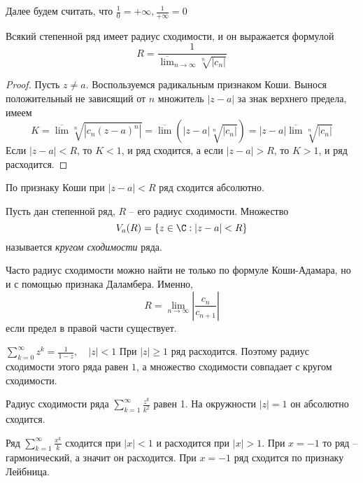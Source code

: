 \begin{Rem}
	Далее будем считать, что $\frac{1}{0} = +\infty, \frac{1}{+\infty} = 0$ 
\end{Rem}

\begin{Thm}
	Всякий степенной ряд имеет радиус сходимости, и он выражается формулой
	\[R = \frac{1}{\displaystyle{\overline{\lim}_{n \to \infty} \sqrt[n]{|c_n|}}}\]
\end{Thm}

\begin{proof}
	Пусть $z \neq a$. Воспользуемся радикальным признаком Коши. Вынося положительный не зависящий от $n$ множитель $|z - a|$ за знак верхнего предела, имеем
	\[K = \overline{\lim} \sqrt[n]{|c_n(z - a)^n|} = \overline{\lim} \left(|z - a| \sqrt[n]{|c_n|}\right) = |z - a| \overline{\lim} \sqrt[n]{|c_n|}\] 
	Если $|z - a| < R$, то $K < 1$, и ряд сходится, а если $|z - a| > R$, то $K > 1$, и ряд расходится.
\end{proof}

\begin{Rem}
	По признаку Коши при $|z - a| < R$ ряд сходится абсолютно.
\end{Rem}

\begin{Def}
	Пусть дан степенной ряд, $R$ -- его радиус сходимости. Множество
	\[V_a(R) = \{z \in \C : |z - a| < R\}\]
	называется \textit{кругом сходимости} ряда. 
\end{Def}

\begin{Rem}
	Часто радиус сходимости можно найти не только по формуле Коши-Адамара, но и с помощью признака Даламбера. Именно,
	\[R = \lim_{n \to \infty} \left| \frac{c_n}{c_{n + 1}}\right|\]
	если предел в правой части существует.
\end{Rem}

\begin{Example}
	$\sum_{k=0}^{\infty} z^k = \frac{1}{1 - z}, \quad |z| < 1$
	При $|z| \geqslant 1$ ряд расходится. Поэтому радиус сходимости этого ряда равен $1$, а множество сходимости совпадает с кругом сходимости. 
\end{Example}

\begin{Example}
	Радиус сходимости ряда $\sum_{k=1}^{\infty} \frac{z^k}{k^2}$ равен 1. На окружности $|z| = 1$ он абсолютно сходится.
\end{Example}

\begin{Example}
	Ряд $\sum_{k=1}^{\infty} \frac{x^k}{k}$ сходится при $|x| < 1$ и расходится при $|x| > 1$. При $x = -1$ то ряд -- гармонический, а значит он расходится.
	При $x = -1$ ряд сходится по признаку Лейбница. 
\end{Example}

